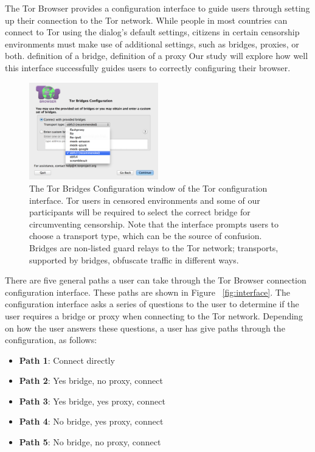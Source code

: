 \documentclass{template}
\begin{document}
The Tor Browser provides a configuration interface to guide users through setting up 
their connection to the
Tor network. While people in most countries can connect to Tor using the
dialog's default settings, citizens in certain censorship environments must
make use of additional settings, such as bridges, proxies, or both. 
{\color {red} definition of a bridge, definition of a proxy}   %
Our study  will explore how well this interface successfully guides users to 
correctly configuring their browser.\\

\begin{figure}[h]
\label{fig:bridges}
  \centering
    \includegraphics[width=0.5\textwidth]{configuration-screenshot.png}
    \caption{The Tor Bridges Configuration window of the Tor configuration
    interface. Tor users in censored environments and some of our participants
    will be required to select the correct bridge for circumventing censorship.
    Note that the interface prompts users to choose a transport type, which can be
    the source of confusion. Bridges are non-listed guard relays to the Tor
    network; transports, supported by bridges, obfuscate traffic in
    different ways.}
\end{figure}

There are five general paths a user can take through the Tor Browser connection
configuration interface. {\color {red} These paths are shown in Figure ~\ref{fig:interface}}. 
The configuration interface asks a series of questions to 
the user to determine if the user requires a bridge or proxy when connecting to 
the Tor network. Depending on how the user answers these questions, a user 
has give paths through the configuration, as follows: 

\begin{itemize} \itemsep1pt \parskip0pt 
\item {\bfseries Path 1}:  Connect directly
\item {\bfseries Path 2}:  Yes bridge, no proxy, connect
\item {\bfseries Path 3}:  Yes bridge, yes proxy, connect 
\item {\bfseries Path 4}:  No bridge, yes proxy, connect 
\item {\bfseries Path 5}:  No bridge, no proxy, connect 
\end{itemize}
 
\end{document}
